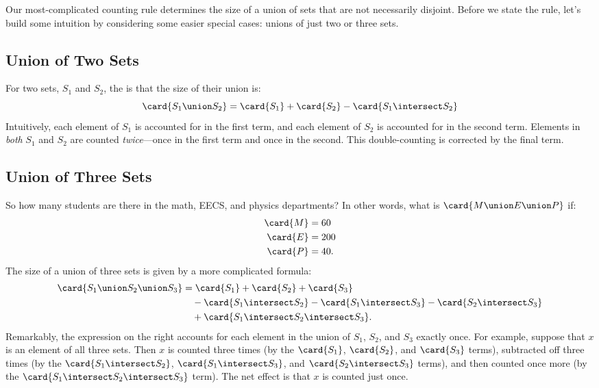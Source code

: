 Our most-complicated counting rule determines the size of a union of
sets that are not necessarily disjoint.  Before we state the rule,
let's build some intuition by considering some easier special cases:
unions of just two or three sets.

\subsection{Union of Two Sets}

For two sets, $S_1$ and $S_2$, the  is that the
size of their union is:
\begin{equation}\label{IE2}
\card{S_1 \union S_2} = \card{S_1} + \card{S_2} - \card{S_1 \intersect S_2}
\end{equation}
Intuitively, each element of $S_1$ is accounted for in the first term,
and each element of $S_2$ is accounted for in the second term.
Elements in \emph{both} $S_1$ and $S_2$ are counted
\emph{twice}---once in the first term and once in the second.  This
double-counting is corrected by the final term.

\subsection{Union of Three Sets}

So how many students are there in the math, EECS, and physics
departments?  In other words, what is $\card{M \union E \union P}$ if:
%
\begin{align*}
\card{M} & = 60 \\
\card{E} & = 200 \\
\card{P} & = 40.
\end{align*}
%
The size of a union of three sets is given by a more complicated
 formula:
%
\begin{align*}
\card{S_1 \union S_2 \union S_3} & = \card{S_1} + \card{S_2} + \card{S_3} \\
  & \quad - \card{S_1 \intersect S_2} - \card{S_1 \intersect S_3} - \card{S_2 \intersect S_3} \\
  & \quad + \card{S_1 \intersect S_2 \intersect S_3}.
\end{align*}
%
Remarkably, the expression on the right accounts for each element in the
union of $S_1$, $S_2$, and $S_3$ exactly once.  For example, suppose that
$x$ is an element of all three sets.  Then $x$ is counted three times (by
the $\card{S_1}$, $\card{S_2}$, and $\card{S_3}$ terms), subtracted off
three times (by the $\card{S_1 \intersect S_2}$, $\card{S_1 \intersect S_3}$, and
$\card{S_2 \intersect S_3}$ terms), and then counted once more (by the
$\card{S_1 \intersect S_2 \intersect S_3}$ term).  The net effect is that $x$ is
counted just once.

